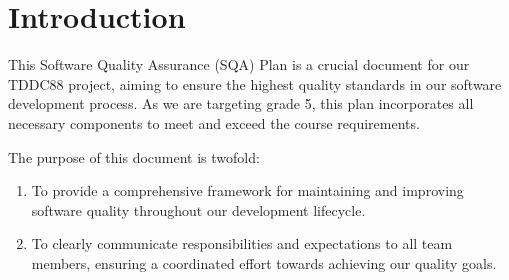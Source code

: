 \documentclass{article}
\begin{document}

\maketitle

\newpage
 
\newpage


\tableofcontents
\newpage

\section{Introduction}
This Software Quality Assurance (SQA) Plan is a crucial document for our TDDC88 project, aiming to ensure the highest quality standards in our software development process. As we are targeting grade 5, this plan incorporates all necessary components to meet and exceed the course requirements.

The purpose of this document is twofold:
\begin{enumerate}
    \item To provide a comprehensive framework for maintaining and improving software quality throughout our development lifecycle.
    \item To clearly communicate responsibilities and expectations to all team members, ensuring a coordinated effort towards achieving our quality goals.
\end{enumerate}
\end{document}
